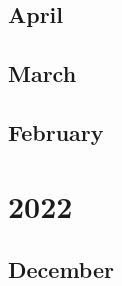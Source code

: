 \documentclass[12pt]{article}
\begin{document}
\subsection{April}
\begin{refsection}
    \nocite{noauthor_230401373_nodate}
    \nocite{liu_visual_2023}
    \printbibliography[heading=none]
\end{refsection}

\subsection{March}
\begin{refsection}
    \nocite{longpre_flan_2023}
    \nocite{touvron2023llamaopenefficientfoundation}
    \nocite{huang_language_2023}
    \nocite{orvieto2023resurrectingrecurrentneuralnetworks}
    \nocite{noauthor_palm-e_nodate}
    \nocite{noauthor_gpt-4_2024}
    \printbibliography[heading=none]
\end{refsection}


\subsection{February}
\begin{refsection}
    \nocite{longpre_flan_2023}
    \nocite{touvron2023llamaopenefficientfoundation}
    \printbibliography[heading=none]
\end{refsection}

\newpage
\section{2022}
\subsection{December}
\begin{refsection}
    \nocite{iyer_opt-iml_2023}
    \printbibliography[heading=none]
\end{refsection}
\end{document}
